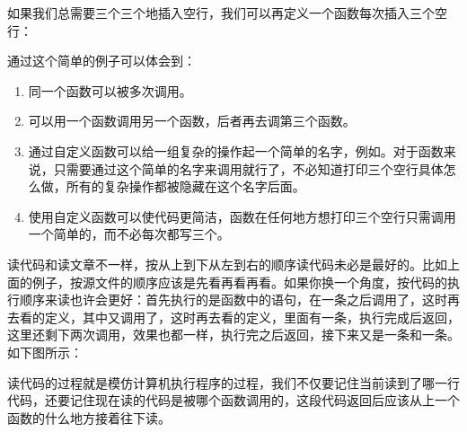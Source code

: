 

如果我们总需要三个三个地插入空行，我们可以再定义一个函数每次插入三个空行：





通过这个简单的例子可以体会到：


\begin{enumerate}

\item 同一个函数可以被多次调用。

\item 可以用一个函数调用另一个函数，后者再去调第三个函数。

\item 通过自定义函数可以给一组复杂的操作起一个简单的名字，例如。对于函数来说，只需要通过这个简单的名字来调用就行了，不必知道打印三个空行具体怎么做，所有的复杂操作都被隐藏在这个名字后面。

\item 使用自定义函数可以使代码更简洁，函数在任何地方想打印三个空行只需调用一个简单的，而不必每次都写三个。
\end{enumerate}


读代码和读文章不一样，按从上到下从左到右的顺序读代码未必是最好的。比如上面的例子，按源文件的顺序应该是先看再看再看。如果你换一个角度，按代码的执行顺序来读也许会更好：首先执行的是函数中的语句，在一条之后调用了，这时再去看的定义，其中又调用了，这时再去看的定义，里面有一条，执行完成后返回，这里还剩下两次调用，效果也都一样，执行完之后返回，接下来又是一条和一条。如下图所示：




读代码的过程就是模仿计算机执行程序的过程，我们不仅要记住当前读到了哪一行代码，还要记住现在读的代码是被哪个函数调用的，这段代码返回后应该从上一个函数的什么地方接着往下读。



